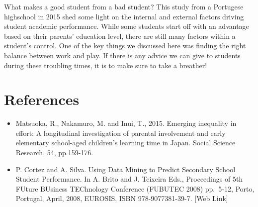 \documentclass[
]{article}
\providecommand{\tightlist}{%
  \setlength{\itemsep}{0pt}\setlength{\parskip}{0pt}}
\begin{document}
What makes a good student from a bad student? This study from a
Portugese highschool in 2015 shed some light on the internal and
external factors driving student academic performance. While some
students start off with an advantage based on their parents' education
level, there are still many factors within a student's control. One of
the key things we discussed here was finding the right balance between
work and play. If there is any advice we can give to students during
these troubling times, it is to make sure to take a breather!

\hypertarget{references}{%
\section{References}\label{references}}

\begin{itemize}
\tightlist
\item
  Matsuoka, R., Nakamuro, M. and Inui, T., 2015. Emerging inequality in
  effort: A longitudinal investigation of parental involvement and early
  elementary school-aged children's learning time in Japan. Social
  Science Research, 54, pp.159-176.
\item
  P. Cortez and A. Silva. Using Data Mining to Predict Secondary School
  Student Performance. In A. Brito and J. Teixeira Eds., Proceedings of
  5th FUture BUsiness TEChnology Conference (FUBUTEC 2008) pp.~5-12,
  Porto, Portugal, April, 2008, EUROSIS, ISBN 978-9077381-39-7. {[}Web
  Link{]}
\end{itemize}
\end{document}
